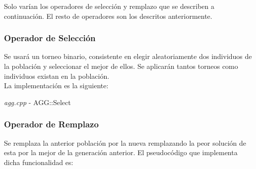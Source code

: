 \documentclass[a4paper, 12pt]{article}
\begin{document}
      Solo varían los operadores de selección y remplazo que se describen a continuación. El resto de operadores son los descritos anteriormente.
      
      \newpage
      \subsubsection*{Operador de Selección}
      Se usará un torneo binario, consistente en elegir aleatoriamente dos individuos de la población y seleccionar el mejor de ellos. Se aplicarán tantos torneos como individuos existan en la población.\\
      
      La implementación es la siguiente:\\
      \begin{algorithm}[H]
       	\caption{\textit{agg.cpp} - AGG::Select}
       	
         \Def{Select($P$)}{
         	\For{$i = 1$ \KwTo $n$}{
				$r1 = $ random in $[0, n)$\\
            	$r2 = $ random in $[0, n)$\\        	
         	
         		\If{coste $P_{r1}$ desconocido}{
            		Calcula coste $P_{r1}$\\
            		evaluaciones++\\
            	}
            	\If{coste $P_{r2}$ desconocido}{
            		Calcula coste $P_{r2}$\\
            		evaluaciones++\\
            	}
            	
            	\If{coste $P_{r1} \leq P_{r2}$}{
            		$P'_i = P_{r1}$\\
            	} \Else {
					$P'_i = P_{r2}$\\
            	}
         	}
                    
            
            \textbf{return} $P'$\\
         }
      \end{algorithm}
      
      
      \newpage
      \subsubsection*{Operador de Remplazo}
      Se remplaza la anterior población por la nueva remplazando la peor solución de esta por la mejor de la generación anterior. El pseudocódigo que implementa dicha funcionalidad es:\\
      
\end{document}
